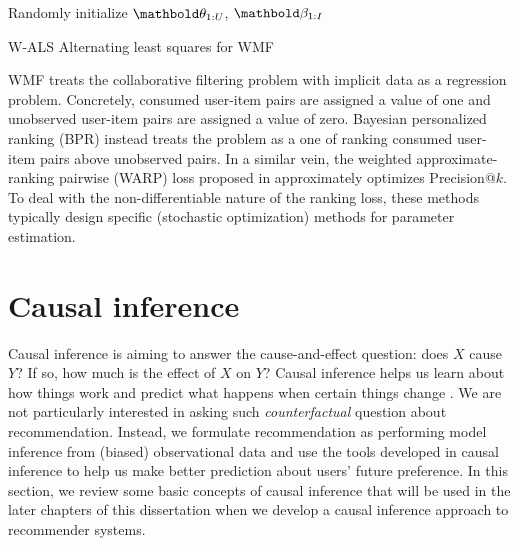 \begin{algorithm}
\DontPrintSemicolon %
Randomly initialize $\mb\theta_{1:U}$, $\mb\beta_{1:I}$\;
\;
\caption{{\sc W-ALS} Alternating least squares for \gls{WMF}}
\label{chpt:background:algo:wmf}
\end{algorithm}

\gls{WMF} treats the collaborative filtering problem with implicit data as a
regression problem. Concretely, consumed user-item pairs are assigned a
value of one and unobserved user-item pairs are assigned a value of zero.
Bayesian personalized ranking (BPR) \citep{rendle2009bpr,
rendle2014improving} instead treats the problem as a one of ranking
consumed user-item pairs above unobserved pairs.
In a similar vein, the weighted approximate-ranking pairwise (WARP) loss
proposed in \citet{weston2011wsabie} approximately optimizes Precision@$k$. 
To deal with the non-differentiable nature of the ranking
loss, these methods typically design specific (stochastic optimization)
methods for parameter estimation.


\section{Causal inference}\label{chpt:background:sec:causal}

Causal inference is aiming to answer the cause-and-effect question: does $X$ cause $Y$? If so, how much is the effect of $X$ on $Y$? Causal inference helps us learn about how things work and predict what happens when certain things change \citep{morgan2014counterfactuals,imbens2015causal}. We are not particularly interested in asking such \textit{counterfactual} question about recommendation. Instead, we formulate recommendation as performing model inference from (biased) observational data and use the tools developed in causal inference to help us make better prediction about users' future preference. In this section, we review some basic concepts of causal inference that will be used in the later chapters of this dissertation when we develop a causal inference approach to recommender systems.  

